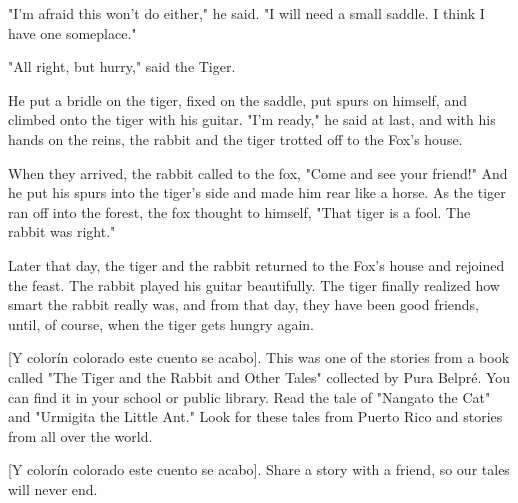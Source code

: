 "I'm afraid this won't do either," he said. "I will need a small saddle. I think I have one someplace."

"All right, but hurry," said the Tiger.

He put a bridle on the tiger, fixed on the saddle, put spurs on himself, and climbed onto the tiger with his guitar. "I'm ready," he said at last, and with his hands on the reins, the rabbit and the tiger trotted off to the Fox's house.

When they arrived, the rabbit called to the fox, "Come and see your friend!" And he put his spurs into the tiger's side and made him rear like a horse. As the tiger ran off into the forest, the fox thought to himself, "That tiger is a fool. The rabbit was right."

Later that day, the tiger and the rabbit returned to the Fox's house and rejoined the feast. The rabbit played his guitar beautifully. The tiger finally realized how smart the rabbit really was, and from that day, they have been good friends, until, of course, when the tiger gets hungry again.

    [Y colorín colorado este cuento se acabo]. This was one of the stories from a book called "The Tiger and the Rabbit and Other Tales" collected by Pura Belpré. You can find it in your school or public library. Read the tale of "Nangato the Cat" and "Urmigita the Little Ant." Look for these tales from Puerto Rico and stories from all over the world.

    [Y colorín colorado este cuento se acabo]. Share a story with a friend, so our tales will never end.